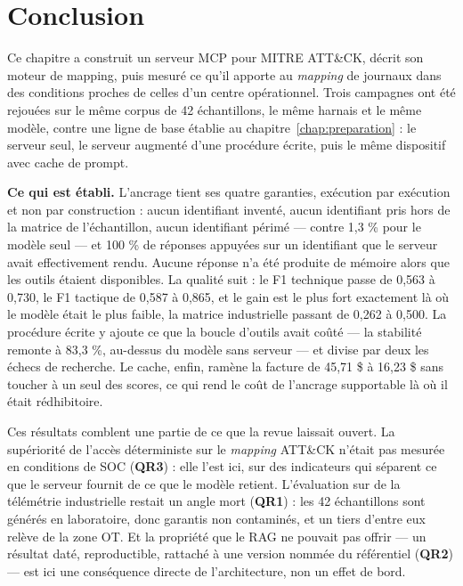 \section{Conclusion}\label{sec:ch2-5}

Ce chapitre a construit un serveur MCP pour MITRE ATT\&CK, décrit son moteur de mapping, puis mesuré ce qu'il apporte au \emph{mapping} de journaux dans des conditions proches de celles d'un centre opérationnel. Trois campagnes ont été rejouées sur le même corpus de 42 échantillons, le même harnais et le même modèle, contre une ligne de base établie au chapitre~\ref{chap:preparation} : le serveur seul, le serveur augmenté d'une procédure écrite, puis le même dispositif avec cache de prompt.

\textbf{Ce qui est établi.} L'ancrage tient ses quatre garanties, exécution par exécution et non par construction : aucun identifiant inventé, aucun identifiant pris hors de la matrice de l'échantillon, aucun identifiant périmé --- contre 1,3 \% pour le modèle seul --- et 100 \% de réponses appuyées sur un identifiant que le serveur avait effectivement rendu. Aucune réponse n'a été produite de mémoire alors que les outils étaient disponibles. La qualité suit : le F1 technique passe de 0,563 à 0,730, le F1 tactique de 0,587 à 0,865, et le gain est le plus fort exactement là où le modèle était le plus faible, la matrice industrielle passant de 0,262 à 0,500. La procédure écrite y ajoute ce que la boucle d'outils avait coûté --- la stabilité remonte à 83,3 \%, au-dessus du modèle sans serveur --- et divise par deux les échecs de recherche. Le cache, enfin, ramène la facture de 45,71 \$ à 16,23 \$ sans toucher à un seul des scores, ce qui rend le coût de l'ancrage supportable là où il était rédhibitoire.

Ces résultats comblent une partie de ce que la revue laissait ouvert. La supériorité de l'accès déterministe sur le \emph{mapping} ATT\&CK n'était pas mesurée en conditions de SOC (\textbf{QR3}) : elle l'est ici, sur des indicateurs qui séparent ce que le serveur fournit de ce que le modèle retient. L'évaluation sur de la télémétrie industrielle restait un angle mort (\textbf{QR1}) : les 42 échantillons sont générés en laboratoire, donc garantis non contaminés, et un tiers d'entre eux relève de la zone OT. Et la propriété que le RAG ne pouvait pas offrir --- un résultat daté, reproductible, rattaché à une version nommée du référentiel (\textbf{QR2}) --- est ici une conséquence directe de l'architecture, non un effet de bord.

